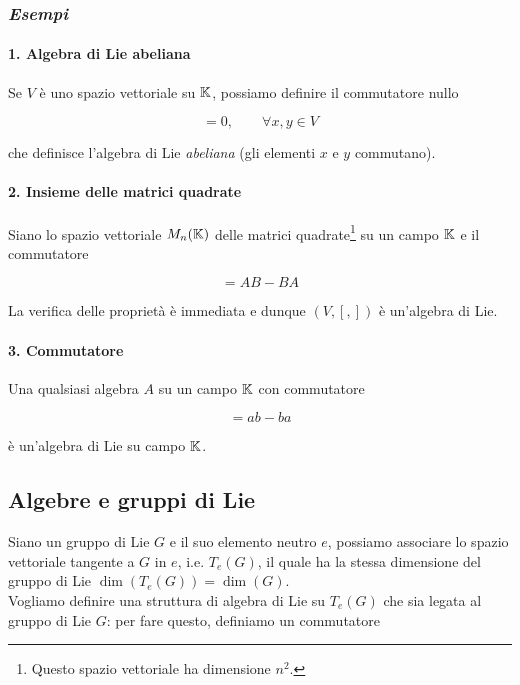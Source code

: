 \subsubsection{\textit{Esempi}}

\paragraph{1. Algebra di Lie abeliana}

Se $ V $ è uno spazio vettoriale su $ \mathbb{K} $, possiamo definire il commutatore nullo

\begin{equation}
	[x,y] = 0, \qquad \forall x,y \in V
\end{equation}

che definisce l'algebra di Lie \textit{abeliana} (gli elementi $ x $ e $ y $ commutano).

\paragraph{2. Insieme delle matrici quadrate}

Siano lo spazio vettoriale $ M_{n}(\mathbb{K}) $ delle matrici quadrate\footnote{%
	Questo spazio vettoriale ha dimensione $ n^{2} $.%
} su un campo $ \mathbb{K} $ e il commutatore

\begin{equation}
	[A,B] = AB - BA
\end{equation}

La verifica delle proprietà è immediata e dunque $ (V,[,]) $ è un'algebra di Lie.

\paragraph{3. Commutatore}

Una qualsiasi algebra $ A $ su un campo $ \mathbb{K} $ con commutatore

\begin{equation}
	[a,b] = ab - ba
\end{equation}

è un'algebra di Lie su campo $ \mathbb{K} $.

\subsection{Algebre e gruppi di Lie}

Siano un gruppo di Lie $ G $ e il suo elemento neutro $ e $, possiamo associare lo spazio vettoriale tangente a $ G $ in $ e $, i.e. $ T_{e}(G) $, il quale ha la stessa dimensione del gruppo di Lie $ \dim(T_{e}(G)) = \dim(G) $.\\
Vogliamo definire una struttura di algebra di Lie su $ T_{e}(G) $ che sia legata al gruppo di Lie $ G $: per fare questo, definiamo un commutatore

